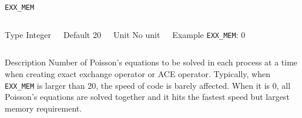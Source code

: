 \begin{frame}[allowframebreaks]{\texttt{EXX\_MEM}} \label{EXX_MEM}
\vspace*{-12pt}
\begin{columns}
\begin{block}{Type}
Integer
\end{block}

\begin{block}{Default}
20
\end{block}

\begin{block}{Unit}
No unit
\end{block}

\begin{block}{Example}
\texttt{EXX\_MEM}: 0
\end{block}
\end{columns}

\begin{block}{Description}
Number of Poisson's equations to be solved in each process at a time when creating exact exchange operator or ACE operator. Typically, when \texttt{EXX\_MEM} is larger than 20, the speed of code is barely affected. When it is 0, all Poisson's equations are solved together and it hits the fastest speed but largest memory requirement. 
\end{block}

\end{frame}


